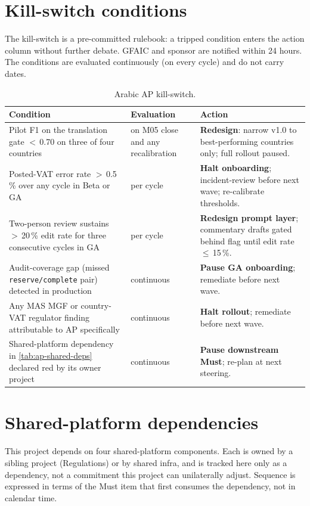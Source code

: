 \section{Kill-switch conditions}\label{sec:ap-kill-switch}

The kill-switch is a pre-committed rulebook: a tripped condition enters
the action column without further debate. GFAIC and sponsor are
notified within 24 hours. The conditions are evaluated continuously
(on every cycle) and do not carry dates.

\begin{table}[htbp]
\centering
\caption{Arabic AP kill-switch.}
\label{tab:ap-kill-switch}
\footnotesize
\begin{tabularx}{\linewidth}{@{}l l X@{}}
\toprule
\textbf{Condition} & \textbf{Evaluation} & \textbf{Action} \\ \midrule
Pilot F1 on the translation gate $<$\,0.70 on three of four countries & on M05 close and any recalibration & \textbf{Redesign}: narrow v1.0 to best-performing countries only; full rollout paused. \\
Posted-VAT error rate $>$\,0.5\,\% over any cycle in Beta or GA & per cycle & \textbf{Halt onboarding}; incident-review before next wave; re-calibrate thresholds. \\
Two-person review sustains $>$\,20\,\% edit rate for three consecutive cycles in GA & per cycle & \textbf{Redesign prompt layer}; commentary drafts gated behind flag until edit rate $\le$\,15\,\%. \\
Audit-coverage gap (missed \texttt{reserve/complete} pair) detected in production & continuous & \textbf{Pause GA onboarding}; remediate before next wave. \\
Any MAS MGF or country-VAT regulator finding attributable to AP specifically & continuous & \textbf{Halt rollout}; remediate before next wave. \\
Shared-platform dependency in \cref{tab:ap-shared-deps} declared red by its owner project & continuous & \textbf{Pause downstream Must}; re-plan at next steering. \\
\bottomrule
\end{tabularx}
\end{table}

\section{Shared-platform dependencies}\label{sec:ap-shared-deps}

This project depends on four shared-platform components. Each is owned
by a sibling project (Regulations) or by shared infra, and is tracked
here only as a dependency, not a commitment this project can
unilaterally adjust. Sequence is expressed in terms of the Must item
that first consumes the dependency, not in calendar time.

